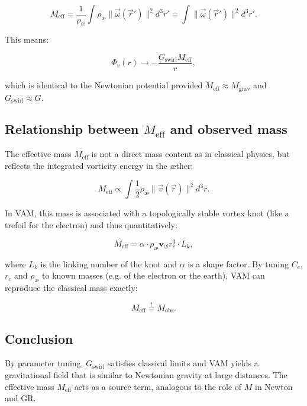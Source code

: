 \documentclass[preprint]{revtex4-2}
\begin{document}
\begin{equation}
  M_\text{eff} = \frac{1}{\rho_\text{æ}} \int \rho_\text{æ} \|\vec{\omega}(\vec{r}')\|^2 d^3r' = \int \|\vec{\omega}(\vec{r}')\|^2 d^3r'.
\end{equation}

This means:

\begin{equation}
  \Phi_v(r) \to -\frac{G_\text{swirl} M_\text{eff}}{r},
\end{equation}

which is identical to the Newtonian potential provided $M_\text{eff} \approx M_\text{grav}$ and $G_\text{swirl} \approx G$.

\subsection{Relationship between $M_\text{eff}$ and observed mass}

The effective mass $M_\text{eff}$ is not a direct mass content as in classical physics, but reflects the integrated vorticity energy in the æther:

\begin{equation}
  M_\text{eff} \propto \int \frac{1}{2} \rho_\text{æ} \|\vec{v}(\vec{r})\|^2 d^3r.
\end{equation}

In VAM, this mass is associated with a topologically stable vortex knot (like a trefoil for the electron) and thus quantitatively:

\begin{equation}
  M_\text{eff} = \alpha \cdot \rho_\text{æ} \mathbf{v}_{\scriptscriptstyle\boldsymbol{\circlearrowleft}} r_c^3 \cdot L_k,
\end{equation}

where $L_k$ is the linking number of the knot and $\alpha$ is a shape factor. By tuning $C_e$, $r_c$ and $\rho_\text{æ}$ to known masses (e.g. of the electron or the earth), VAM can reproduce the classical mass exactly:

\begin{equation}
  M_\text{eff} \overset{!}{=} M_\text{obs}.
\end{equation}

\subsection{Conclusion}

By parameter tuning, $G_\text{swirl}$ satisfies classical limits and VAM yields a gravitational field that is similar to Newtonian gravity at large distances. The effective mass $M_\text{eff}$ acts as a source term, analogous to the role of $M$ in Newton and GR.
\end{document}
